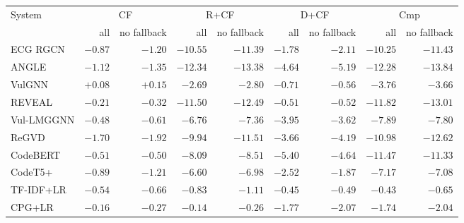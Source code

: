 \begin{tabular}{lrrrrrrrr}
\toprule
System & \multicolumn{2}{c}{CF} & \multicolumn{2}{c}{R+CF} & \multicolumn{2}{c}{D+CF} & \multicolumn{2}{c}{Cmp} \\
 & all & no fallback & all & no fallback & all & no fallback & all & no fallback \\
\midrule
ECG RGCN & $\mathbf{-0.87}$ & $\mathbf{-1.20}$ & $\mathbf{-10.55}$ & $\mathbf{-11.39}$ & $\mathbf{-1.78}$ & $\mathbf{-2.11}$ & $\mathbf{-10.25}$ & $\mathbf{-11.43}$ \\
ANGLE & $-1.12$ & $-1.35$ & $\mathbf{-12.34}$ & $\mathbf{-13.38}$ & $-4.64$ & $-5.19$ & $\mathbf{-12.28}$ & $\mathbf{-13.84}$ \\
VulGNN & $+0.08$ & $+0.15$ & $-2.69$ & $-2.80$ & $-0.71$ & $-0.56$ & $-3.76$ & $-3.66$ \\
REVEAL & $-0.21$ & $-0.32$ & $\mathbf{-11.50}$ & $\mathbf{-12.49}$ & $-0.51$ & $-0.52$ & $\mathbf{-11.82}$ & $\mathbf{-13.01}$ \\
Vul-LMGGNN & $-0.48$ & $-0.61$ & $\mathbf{-6.76}$ & $\mathbf{-7.36}$ & $\mathbf{-3.95}$ & $\mathbf{-3.62}$ & $\mathbf{-7.89}$ & $\mathbf{-7.80}$ \\
ReGVD & $\mathbf{-1.70}$ & $\mathbf{-1.92}$ & $\mathbf{-9.94}$ & $\mathbf{-11.51}$ & $\mathbf{-3.66}$ & $\mathbf{-4.19}$ & $\mathbf{-10.98}$ & $\mathbf{-12.62}$ \\
CodeBERT & $-0.51$ & $-0.50$ & $\mathbf{-8.09}$ & $\mathbf{-8.51}$ & $\mathbf{-5.40}$ & $\mathbf{-4.64}$ & $\mathbf{-11.47}$ & $\mathbf{-11.33}$ \\
CodeT5+ & $-0.89$ & $-1.21$ & $\mathbf{-6.60}$ & $\mathbf{-6.98}$ & $\mathbf{-2.52}$ & $\mathbf{-1.87}$ & $\mathbf{-7.17}$ & $\mathbf{-7.08}$ \\
TF-IDF+LR & $-0.54$ & $-0.66$ & $-0.83$ & $-1.11$ & $-0.45$ & $-0.49$ & $-0.43$ & $-0.65$ \\
CPG+LR & $-0.16$ & $-0.27$ & $-0.14$ & $-0.26$ & $-1.77$ & $-2.07$ & $-1.74$ & $-2.04$ \\
\bottomrule
\end{tabular}
